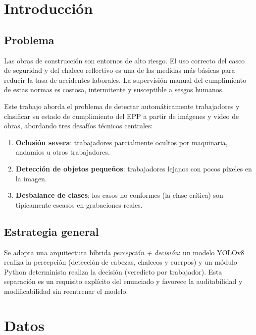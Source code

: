 \documentclass[conference]{IEEEtran}
\begin{document}
\section{Introducción}

\subsection{Problema}

Las obras de construcción son entornos de alto riesgo. El uso correcto del
casco de seguridad y del chaleco reflectivo es una de las medidas más básicas
para reducir la tasa de accidentes laborales. La supervisión manual del
cumplimiento de estas normas es costosa, intermitente y susceptible a sesgos
humanos.

Este trabajo aborda el problema de detectar automáticamente trabajadores y
clasificar su estado de cumplimiento del EPP a partir de imágenes y video
de obras, abordando tres desafíos técnicos centrales:
\begin{enumerate}
    \item \textbf{Oclusión severa}: trabajadores parcialmente ocultos por
    maquinaria, andamios u otros trabajadores.
    \item \textbf{Detección de objetos pequeños}: trabajadores lejanos con
    pocos píxeles en la imagen.
    \item \textbf{Desbalance de clases}: los casos no conformes (la clase
    crítica) son típicamente escasos en grabaciones reales.
\end{enumerate}

\subsection{Estrategia general}

Se adopta una arquitectura híbrida \emph{percepción + decisión}:
un modelo YOLOv8 realiza la percepción (detección de cabezas, chalecos y
cuerpos) y un módulo Python determinista realiza la decisión (veredicto
por trabajador). Esta separación es un requisito explícito del enunciado
y favorece la auditabilidad y modificabilidad sin reentrenar el modelo.

\section{Datos}
\end{document}
